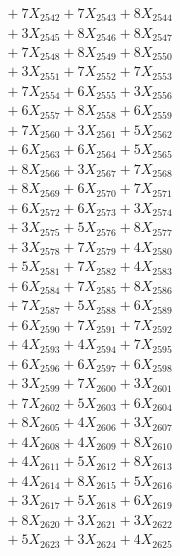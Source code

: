 \documentclass[a4paper,10pt]{article}
\begin{document}
{\begin{align}
&\;  + 7 X_{2542} + 7 X_{2543} + 8 X_{2544} \\[0.3ex]
&\;  + 3 X_{2545} + 8 X_{2546} + 8 X_{2547} \\[0.3ex]
&\;  + 7 X_{2548} + 8 X_{2549} + 8 X_{2550} \\[0.3ex]
&\;  + 3 X_{2551} + 7 X_{2552} + 7 X_{2553} \\[0.3ex]
&\;  + 7 X_{2554} + 6 X_{2555} + 3 X_{2556} \\[0.3ex]
&\;  + 6 X_{2557} + 8 X_{2558} + 6 X_{2559} \\[0.5ex]\allowbreak
&\;  + 7 X_{2560} + 3 X_{2561} + 5 X_{2562} \\[0.3ex]
&\;  + 6 X_{2563} + 6 X_{2564} + 5 X_{2565} \\[0.3ex]
&\;  + 8 X_{2566} + 3 X_{2567} + 7 X_{2568} \\[0.3ex]
&\;  + 8 X_{2569} + 6 X_{2570} + 7 X_{2571} \\[0.3ex]
&\;  + 6 X_{2572} + 6 X_{2573} + 3 X_{2574} \\[0.3ex]
&\;  + 3 X_{2575} + 5 X_{2576} + 8 X_{2577} \\[0.3ex]
&\;  + 3 X_{2578} + 7 X_{2579} + 4 X_{2580} \\[0.3ex]
&\;  + 5 X_{2581} + 7 X_{2582} + 4 X_{2583} \\[0.3ex]
&\;  + 6 X_{2584} + 7 X_{2585} + 8 X_{2586} \\[0.3ex]
&\;  + 7 X_{2587} + 5 X_{2588} + 6 X_{2589} \\[0.5ex]\allowbreak
&\;  + 6 X_{2590} + 7 X_{2591} + 7 X_{2592} \\[0.3ex]
&\;  + 4 X_{2593} + 4 X_{2594} + 7 X_{2595} \\[0.3ex]
&\;  + 6 X_{2596} + 6 X_{2597} + 6 X_{2598} \\[0.3ex]
&\;  + 3 X_{2599} + 7 X_{2600} + 3 X_{2601} \\[0.3ex]
&\;  + 7 X_{2602} + 5 X_{2603} + 6 X_{2604} \\[0.3ex]
&\;  + 8 X_{2605} + 4 X_{2606} + 3 X_{2607} \\[0.3ex]
&\;  + 4 X_{2608} + 4 X_{2609} + 8 X_{2610} \\[0.3ex]
&\;  + 4 X_{2611} + 5 X_{2612} + 8 X_{2613} \\[0.3ex]
&\;  + 4 X_{2614} + 8 X_{2615} + 5 X_{2616} \\[0.3ex]
&\;  + 3 X_{2617} + 5 X_{2618} + 6 X_{2619} \\[0.5ex]\allowbreak
&\;  + 8 X_{2620} + 3 X_{2621} + 3 X_{2622} \\[0.3ex]
&\;  + 5 X_{2623} + 3 X_{2624} + 4 X_{2625} \\[0.3ex]

\end{align}}
\end{document}

